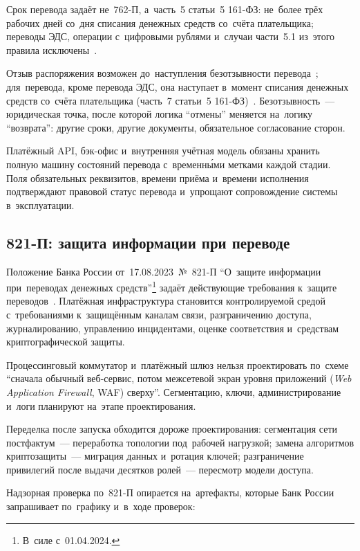 Срок перевода задаёт не~762-П, а~часть~5 статьи~5 161-ФЗ: не~более трёх
рабочих дней со~дня списания денежных средств со~счёта плательщика; переводы
ЭДС, операции с~цифровыми рублями и~случаи части~5.1 из~этого правила
исключены~\cite{fz-161}.

Отзыв распоряжения возможен до~наступления безотзывности
перевода~\cite{cbr-762p}; для~перевода, кроме перевода ЭДС, она наступает
в~момент списания денежных средств со~счёта плательщика (часть~7 статьи~5
161-ФЗ)~\cite{fz-161}. Безотзывность~--- юридическая точка, после которой
логика \enquote{отмены} меняется на~логику \enquote{возврата}: другие сроки,
другие документы, обязательное согласование сторон.

Платёжный API, бэк-офис и~внутренняя учётная модель обязаны хранить полную
машину состояний перевода с~временн\'{ы}ми метками каждой стадии. Поля
обязательных реквизитов, времени приёма и~времени исполнения подтверждают
правовой статус перевода и~упрощают сопровождение системы в~эксплуатации.

\subsection*{821-П: защита информации при переводе}

Положение Банка России от~17.08.2023~№~821-П \enquote{О~защите информации
при~переводах денежных средств}\footnote{В~силе с~01.04.2024.} задаёт
действующие требования к~защите переводов~\cite{cbr-821p}. Платёжная
инфраструктура становится контролируемой средой с~требованиями к~защищённым
каналам связи, разграничению доступа, журналированию, управлению инцидентами,
оценке соответствия и~средствам криптографической защиты.

Процессинговый коммутатор и~платёжный шлюз нельзя проектировать по~схеме
\enquote{сначала обычный веб-сервис, потом межсетевой экран уровня приложений
(\textit{Web Application Firewall}, WAF) сверху}. Сегментацию, ключи, администрирование
и~логи планируют на~этапе проектирования.

Переделка после запуска обходится дороже проектирования: сегментация сети
постфактум~--- переработка топологии под~рабочей нагрузкой; замена алгоритмов
криптозащиты~--- миграция данных и~ротация ключей; разграничение привилегий
после выдачи десятков ролей~--- пересмотр модели доступа.

Надзорная проверка по~821-П опирается на~артефакты, которые Банк России
запрашивает по~графику и~в~ходе проверок:

